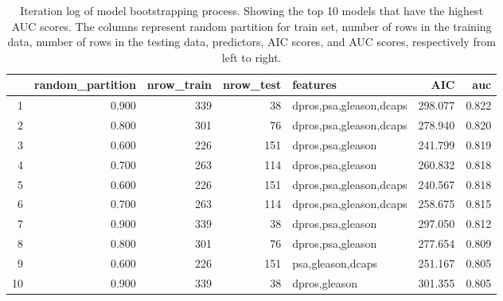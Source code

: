 \documentclass[11pt]{article}\usepackage[]{graphicx}\usepackage[]{color}
\begin{document}
\begin{center}
\begin{table}[ht]
\centering
\begin{tabular}{rrrrlrr}
  \hline
 & random\_partition & nrow\_train & nrow\_test & features & AIC & auc \\ 
  \hline
1 & 0.900 &  339 &   38 & dpros,psa,gleason,dcaps & 298.077 & 0.822 \\ 
  2 & 0.800 &  301 &   76 & dpros,psa,gleason,dcaps & 278.940 & 0.820 \\ 
  3 & 0.600 &  226 &  151 & dpros,psa,gleason & 241.799 & 0.819 \\ 
  4 & 0.700 &  263 &  114 & dpros,psa,gleason & 260.832 & 0.818 \\ 
  5 & 0.600 &  226 &  151 & dpros,psa,gleason,dcaps & 240.567 & 0.818 \\ 
  6 & 0.700 &  263 &  114 & dpros,psa,gleason,dcaps & 258.675 & 0.815 \\ 
  7 & 0.900 &  339 &   38 & dpros,psa,gleason & 297.050 & 0.812 \\ 
  8 & 0.800 &  301 &   76 & dpros,psa,gleason & 277.654 & 0.809 \\ 
  9 & 0.600 &  226 &  151 & psa,gleason,dcaps & 251.167 & 0.805 \\ 
  10 & 0.900 &  339 &   38 & dpros,gleason & 301.355 & 0.805 \\ 
   \hline
\end{tabular}
\caption{Iteration log of model bootstrapping process. Showing the top 10 models that have the highest AUC scores. The columns represent random partition for train set, number of rows in the training data, number of rows in the testing data, predictors, AIC scores, and AUC scores, respectively from left to right.} 
\label{reg_bootstrap}
\end{table}

\end{center}
\end{document}
